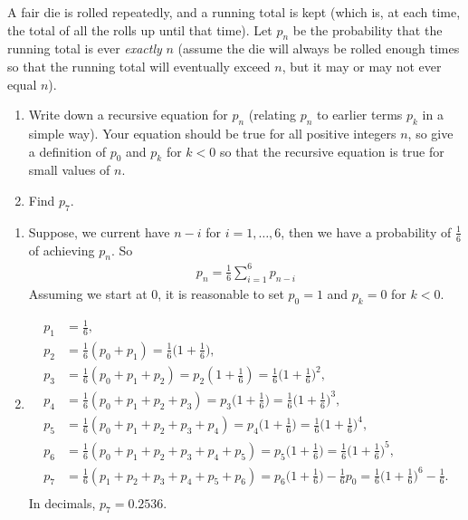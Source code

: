 

\setcounter{theorem}{19}

\begin{exercise}[BH.2.20]
  A fair die is rolled repeatedly, and a running total is kept (which is, at each time, the total of all the rolls up until that time). Let $p_n$ be the probability that the running total is ever \emph{exactly} $n$ (assume the die will always be rolled enough times so that the running total will eventually exceed $n$, but it may or may not ever equal $n$).
	\begin{enumerate}
		\item  Write down a recursive equation for $p_n$ (relating $p_n$ to earlier terms $p_k$ in a simple way). Your equation should be true for all positive integers $n$, so give a definition of $p_0$ and $p_k$ for $k < 0$ so that the recursive equation is true for small values of $n$.
		\item Find $p_7$.
	\end{enumerate}
\begin{solution}
	\begin{enumerate}
		\item Suppose, we current have $n-i$ for $i=1,\ldots,6$, then we have a probability of $\frac{1}{6}$ of achieving $p_{n}$. So
		\begin{align*}
			p_{n} = \frac{1}{6}\sum_{i=1}^{6}p_{n-i}
		\end{align*}
		Assuming we start at 0, it is reasonable to set $p_{0}=1$ and $p_{k}=0$ for $k<0$. 
		\item
		\begin{align*}
			p_{1} &= \frac{1}{6},\\
			p_{2} &= \frac{1}{6}(p_{0}+p_{1}) =\frac{1}{6}\bigg(1+\frac{1}{6}\bigg),\\
			p_{3} &= \frac{1}{6}(p_{0}+p_{1}+p_{2}) = p_{2}(1+\frac{1}{6})=\frac{1}{6}\bigg(1+\frac{1}{6}\bigg)^2,\\
			p_{4} & = \frac{1}{6}(p_{0}+p_{1}+p_{2}+p_{3})=p_{3}\bigg(1+\frac{1}{6}\bigg) = \frac{1}{6}\bigg(1+\frac{1}{6}\bigg)^3,\\
			p_{5} & = \frac{1}{6}(p_{0}+p_{1}+p_{2}+p_{3} + p_{4})=p_{4}\bigg(1+\frac{1}{6}\bigg) = \frac{1}{6}\bigg(1+\frac{1}{6}\bigg)^4,\\
			p_{6} & = \frac{1}{6}(p_{0}+p_{1}+p_{2}+p_{3}+p_{4}+p_{5})=p_{5}\bigg(1+\frac{1}{6}\bigg) = \frac{1}{6}\bigg(1+\frac{1}{6}\bigg)^5,\\
			p_{7} & = \frac{1}{6}(p_{1}+p_{2}+p_{3}+p_{4}+p_{5}+p_{6})=p_{6}\bigg(1+\frac{1}{6}\bigg)-\frac{1}{6}p_{0}  = \frac{1}{6}\bigg(1+\frac{1}{6}\bigg)^6-\frac{1}{6}.\\	
		\end{align*}
		In decimals, $p_{7}=0.2536$.
	\end{enumerate}
\end{solution}
\end{exercise}

